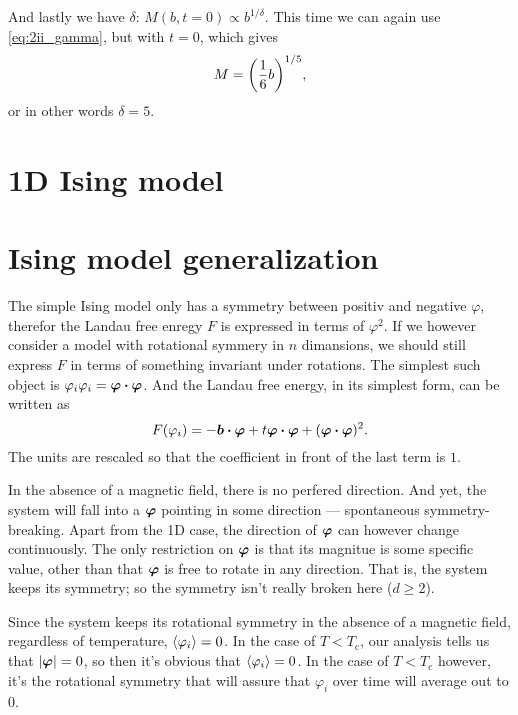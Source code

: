 \documentclass[11pt,letter, swedish, english
]{article}
\newcommand{\Tc}{\ensuremath{T_{\text{c}}}}
\begin{document}
And lastly we have $\delta$: $M(b,t=0)\propto b^{1/\delta}$. This time
we can again use \eqref{eq:2ii_gamma}, but with $t=0$, which gives
\begin{equation}
M=\qty(\frac{1}{6}b)^{1/5},
\end{equation}
or in other words $\delta=5$.



\section{1D Ising model}



\section{Ising model generalization}
The simple Ising model only has a symmetry between positiv and
negative $\varphi$, therefor the Landau free enregy $F$ is expressed in
terms of $\varphi^2$. If we however consider a model with rotational
symmery in $n$ dimansions, we should still express $F$ in terms of
something invariant under rotations. The simplest such object is
$\varphi_i\varphi_i=\vb*{\varphi}\vdot\vb*{\varphi}$. And the Landau
free energy, in its simplest form, can be written as
\begin{equation}\label{eq:4_start}
F(\varphi_i)=-\vb*{b}\vdot\vb*{\varphi}+t\vb*{\varphi}\vdot\vb*{\varphi}
+(\vb*{\varphi}\vdot\vb*{\varphi})^2.
\end{equation}
The units are rescaled so that the coefficient in front of the
last term is $1$. 

In the absence of a magnetic field, there is no perfered
direction. And yet, the system will fall into a $\vb*\varphi$ pointing
in some direction --- spontaneous symmetry-breaking. Apart from the 1D
case, the direction of $\vb*\varphi$ can however change continuously. The only
restriction on $\vb*\varphi$ is that its magnitue is some specific
value, other than that $\vb*\varphi$ is free to rotate in any
direction. That is, the system keeps its symmetry; so the symmetry
isn't really broken here ($d\ge2$).

Since the system keeps its rotational symmetry in the absence of a
magnetic field, regardless of temperature, $\ev{\varphi_i}=0$. In the
case of $T<\Tc$, our analysis tells us that $|\vb*\varphi|=0$, so then
it's obvious that $\ev{\varphi_i}=0$. In the case of $T<\Tc$ however,
it's the rotational symmetry that will assure that $\varphi_i$ over
time will average out to 0. 
\end{document}

